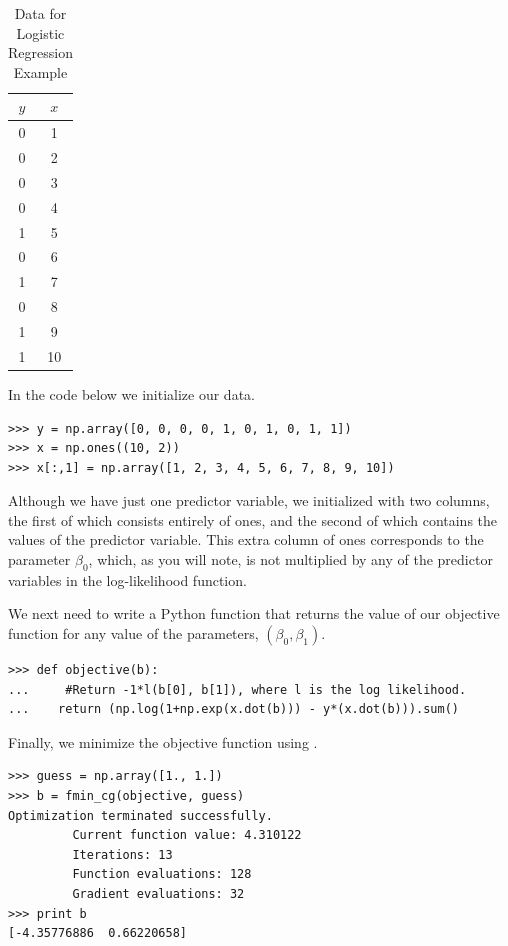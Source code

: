 \begin{table}
  \caption{Data for Logistic Regression Example}
  \centering
  \begin{tabular}{c c}
    \hline\hline
    $y$ & $x$\\
    \hline
    0 & 1 \\
    0 & 2 \\
    0 & 3 \\
    0 & 4 \\
    1 & 5 \\
    0 & 6 \\
    1 & 7 \\
    0 & 8 \\
    1 & 9 \\
    1 & 10\\
    \hline
  \end{tabular}
  \label{table:data}
\end{table}

In the code below we initialize our data.
\begin{lstlisting}
>>> y = np.array([0, 0, 0, 0, 1, 0, 1, 0, 1, 1])
>>> x = np.ones((10, 2))
>>> x[:,1] = np.array([1, 2, 3, 4, 5, 6, 7, 8, 9, 10])
\end{lstlisting}
Although we have just one predictor variable, we initialized  with two columns,
the first of which consists entirely of ones, and the second of which contains the values of the
predictor variable. This extra column of ones corresponds to the parameter $\beta_0$, which, as you
will note, is not multiplied by any of the predictor variables in the log-likelihood function.

We next need to write a Python function that returns the value of our objective function for any value of the parameters,
$(\beta_0, \beta_1)$.
\begin{lstlisting}
>>> def objective(b):
...     #Return -1*l(b[0], b[1]), where l is the log likelihood.
...    return (np.log(1+np.exp(x.dot(b))) - y*(x.dot(b))).sum()
\end{lstlisting}

Finally, we minimize the objective function using .
\begin{lstlisting}
>>> guess = np.array([1., 1.])
>>> b = fmin_cg(objective, guess)
Optimization terminated successfully.
         Current function value: 4.310122
         Iterations: 13
         Function evaluations: 128
         Gradient evaluations: 32
>>> print b
[-4.35776886  0.66220658]
\end{lstlisting}

